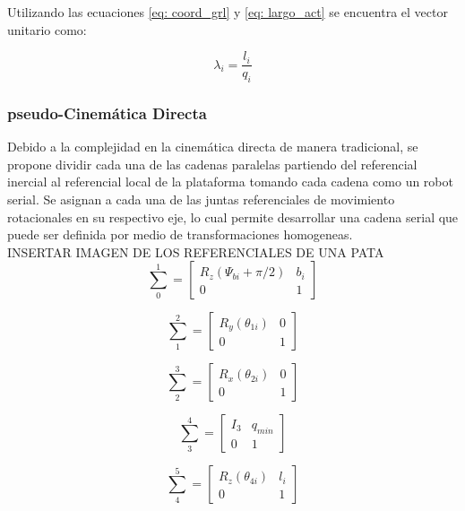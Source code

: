 Utilizando las ecuaciones \ref{eq: coord_grl} y \ref{eq: largo_act} se encuentra el vector unitario como:

\begin{equation} \label{eq: vec_U}
\lambda_i = \frac{l_i}{q_i}
\end{equation}

\subsubsection{pseudo-Cinemática Directa}
Debido a la complejidad en la cinemática directa de manera tradicional, se propone 
dividir cada una de las cadenas paralelas partiendo del referencial inercial al referencial 
local de la plataforma tomando cada cadena como un robot serial. Se asignan a cada una de 
las juntas referenciales de movimiento rotacionales en su respectivo eje, lo cual permite 
desarrollar una cadena serial que puede ser definida por medio de transformaciones 
homogeneas.\\

INSERTAR IMAGEN DE LOS REFERENCIALES DE UNA PATA\\

\begin{equation}
\sum_0^1 = \begin{bmatrix}
R_z(\Psi_{bi} + \pi/2) & b_i\\
0 & 1
\end{bmatrix}
\end{equation}

\begin{equation}
\sum_1^2 = \begin{bmatrix}
R_y(\theta_{1i}) & 0\\
0 & 1
\end{bmatrix}
\end{equation}

\begin{equation}
\sum_2^3 = \begin{bmatrix}
R_x(\theta_{2i}) & 0\\
0 & 1
\end{bmatrix}
\end{equation}

\begin{equation}
\sum_3^4 = \begin{bmatrix}
I_3 & q_{min}\\
0 & 1
\end{bmatrix}
\end{equation}

\begin{equation}
\sum_4^5 = \begin{bmatrix}
R_z(\theta_{4i}) & l_i\\
0 & 1
\end{bmatrix}
\end{equation}


